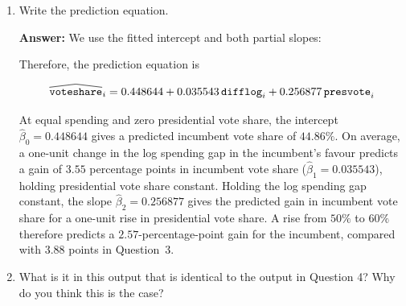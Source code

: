 \documentclass[12pt,letterpaper]{article}
\newcommand{\rcode}[2]{}
\newcommand{\answer}{\par\vspace{.18cm}\noindent\textbf{Answer:} }
\renewcommand{\widehat}[1]{\mathord{\tikz[baseline=(outcome.base)]{
  \node[inner sep=0pt,outer sep=0pt] (outcome) {$#1$};
  \draw[line width=.48pt,line join=round]
    ([yshift=1.1pt]outcome.north west) -- ([yshift=4pt]outcome.north) --
    ([yshift=1.1pt]outcome.north east);}}}
\begin{document}
\begin{enumerate}[(1)]
For each predictor, our null hypothesis is that its population slope is zero with the other predictor held fixed. The two-sided alternative is that its slope differs from zero. We reject both null hypotheses at the 5\% level $(p<0.001$ for each slope). Together the predictors explain $44.96\%$ of the variation in incumbent vote share.

\newpage

\item Write the prediction equation.

\answer We use the fitted intercept and both partial slopes:

\rcode{210}{211}

\par\nobreak
{\footnotesize\setlength{\tabcolsep}{4pt}\renewcommand{\arraystretch}{0.93}%
\noindent{}\par}
\smallskip


Therefore, the prediction equation is

$$\widehat{\texttt{voteshare}}_i=0.448644+0.035543\,\texttt{difflog}_i+0.256877\,\texttt{presvote}_i$$

At equal spending and zero presidential vote share, the intercept $\hat{\beta}_0=0.448644$ gives a predicted incumbent vote share of $44.86\%$. On average, a one-unit change in the log spending gap in the incumbent's favour predicts a gain of $3.55$ percentage points in incumbent vote share ($\hat{\beta}_1=0.035543$), holding presidential vote share constant. Holding the log spending gap constant, the slope $\hat{\beta}_2=0.256877$ gives the predicted gain in incumbent vote share for a one-unit rise in presidential vote share. A rise from $50\%$ to $60\%$ therefore predicts a $2.57$-percentage-point gain for the incumbent, compared with $3.88$ points in Question~3.

\item What is it in this output that is identical to the output in Question 4? Why do you think this is the case?


\end{enumerate}
\end{document}
